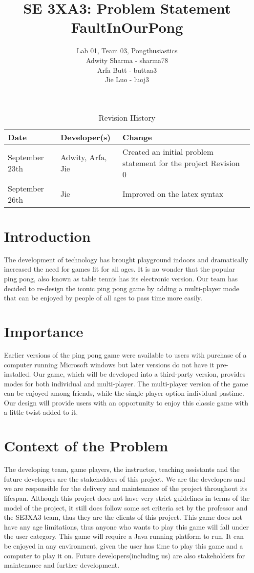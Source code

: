 \documentclass{article}
\title{SE 3XA3: Problem Statement\\FaultInOurPong}
\author{Lab 01, Team 03, Pongthusiastics
		\\ Adwity Sharma - sharma78
		\\ Arfa Butt - buttaa3
		\\ Jie Luo - luoj3
}
\date{}
\begin{document}
\begin{table}[hp]
\caption{Revision History} \label{TblRevisionHistory}
\begin{tabularx}{\textwidth}{llX}
\toprule
\textbf{Date} & \textbf{Developer(s)} & \textbf{Change}\\
\midrule
September 23th & Adwity, Arfa, Jie & Created an initial problem statement for
the project Revision 0\\
September 26th & Jie & Improved on the latex syntax\\
\bottomrule
\end{tabularx}
\end{table}

\newpage

\maketitle
\section{Introduction}
The development of technology has brought playground indoors and dramatically
increased the need for games fit for all ages. It is no wonder that the popular
ping pong, also known as table tennis has its electronic version. Our team has
decided to re-design the iconic ping pong game by adding a multi-player mode
that can be enjoyed by people of all ages to pass time more easily. 

\section{Importance}
Earlier versions of the ping pong game were available to users with purchase of
a computer running Microsoft windows but later versions do not have it
pre-installed. Our game, which will be developed into a third-party version,
provides modes for both individual and multi-player. The multi-player version of
the game can be enjoyed among friends, while the single player option individual
pastime. Our design will provide users with an opportunity to enjoy this classic
game with a little twist added to it. 

\section{Context of the Problem}
The developing team, game players, the instructor, teaching assistants and the
future developers are the stakeholders of this project. We are the developers
and we are responsible for the delivery and maintenance of the project
throughout its lifespan. Although this project does not have very strict
guidelines in terms of the model of the project, it still does follow some set
criteria set by the professor and the SE3XA3 team, thus they are the clients of
this project. This game does not have any age limitations, thus anyone who wants
to play this game will fall under the user category. This game will require a
Java running platform to run. It can be enjoyed in any environment, given the
user has time to play this game and a computer to play it on. Future
developers(including us) are also stakeholders for maintenance and further
development.\\
\end{document}
